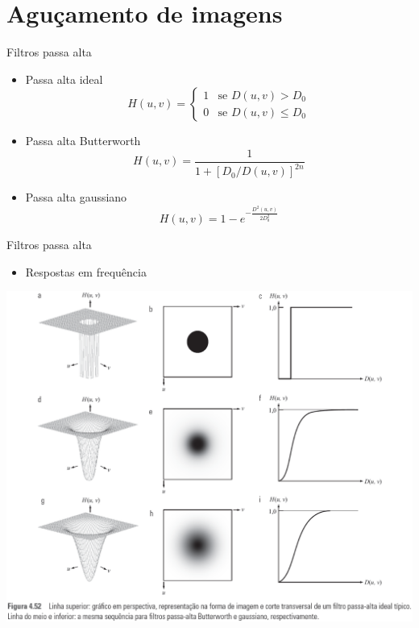    \section[slide=true]{Aguçamento de imagens}
      \begin{slide}[toc=]{Filtros passa alta}
         \begin{itemize}[type=1]
            \item Passa alta ideal
            \begin{equation*}
               H(u,v) = \begin{cases}
                           1& \text{se }D(u,v)> D_0\\
                           0& \text{se }D(u,v)\leq D_0
                        \end{cases}
            \end{equation*}
            \item Passa alta Butterworth
            \begin{equation*}
               H(u,v) = \frac{1}{1+\left[ D_0/D(u,v)\right]^{2n}}
            \end{equation*}
            \item Passa alta gaussiano
            \begin{equation*}
               H(u,v) = 1-e^{-\frac{D^2(u,v)}{2D^2_0}}
            \end{equation*}
         \end{itemize}
      \end{slide}
      
      \begin{slide}[toc=]{Filtros passa alta}
         \begin{itemize}[type=1]
            \item Respostas em frequência
         \end{itemize}
	      \begin{center}
		      \includegraphics[height=0.7\textheight]{figs/fig0452}
	      \end{center}
      \end{slide}
      
